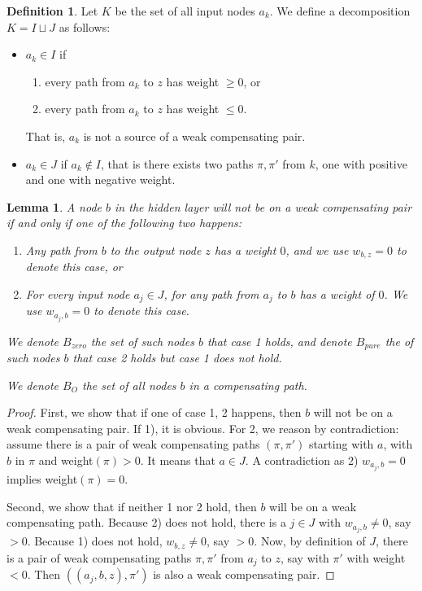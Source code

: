 \documentclass[]{article}
\newtheorem{lemma}{Lemma}
\theoremstyle{definition}
\newtheorem{definition}{Definition}
\begin{document}
			
			\begin{definition}
				Let $K$ be the set of  all input nodes $a_k$. 
				We define a decomposition $K=I\sqcup J$ as follows:  
				\begin{itemize}
					\item $a_k \in I$  if
					\begin{enumerate}
						\item every path from $a_k$ to $z$ has weight $\geq 0$, or
						\item every path from $a_k$ to $z$ has weight $\leq 0$.
					\end{enumerate}
					That is, $a_k$ is not a source of a weak compensating pair.
					\item $a_k \in J$ if $a_k \notin I$, that is there exists two paths $\pi,\pi'$ from $k$, 
					one with positive and one with negative weight.
				\end{itemize}
			\end{definition} 
			
			
			
			\begin{lemma} \label{lem:open_node_2}
				A node $b$ in the hidden layer will not be on a weak compensating pair if and only if one of the following two happens:
				\begin{enumerate}
					\item Any path from $b$ to the output node $z$ has a weight $0$, and we use $w_{b,z}=0$ to denote this case, or
					\item For every input node $a_j\in J$, for any path from $a_j$ to $b$ has a weight of $0$. We use $w_{a_j,b}=0$ to denote this case.
				\end{enumerate}
				We denote $B_{zero}$ the set of such nodes $b$ that case 1 holds, and denote $B_{pure}$ the of such nodes $b$ that case 2 holds but case 1 does not hold.
				
				We denote $B_O$ the set of all nodes $b$ in a compensating path.
			\end{lemma}
			
			\begin{proof}
				First, we show that if one of case 1, 2 happens, then $b$ will not be on a weak compensating pair. If 1), it is obvious. For 2, we reason by contradiction: assume there is a pair of weak compensating paths 	$(\pi,\pi')$ starting with $a$, with $b$ in $\pi$ and weight$(\pi) > 0$. It means that $a \in J$. A contradiction as 2) $w_{a_j,b}=0$ implies weight$(\pi)=0$.
				
				Second, we show that if neither 1 nor 2 hold, then $b$ will be on a weak compensating path.
				Because 2) does not hold, there is a $j \in J$ with $w_{a_j,b} \neq 0$, say $>0$.
				Because 1) does not hold, $w_{b,z} \neq 0$, say $>0$.
				Now, by definition of $J$, there is a pair of weak compensating paths $\pi,\pi'$ 
				from $a_j$ to $z$, say with $\pi'$ with weight $<0$.
				Then $((a_j,b,z), \pi')$ is also a weak compensating pair.
			\end{proof}
			
\end{document}
